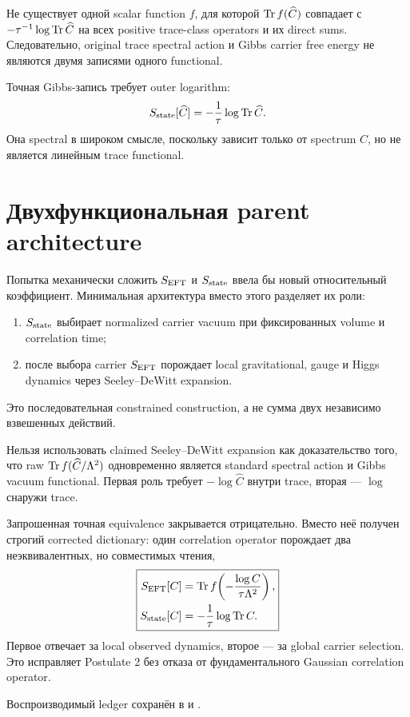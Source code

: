\begin{theorem}[Additivity no-go]
Не существует одной scalar function \(f\), для которой
\(\operatorname{Tr} f(\widehat C)\) совпадает с
\(-\tau^{-1}\log\operatorname{Tr}\widehat C\) на всех positive trace-class operators и их
direct sums. Следовательно, original trace spectral action и Gibbs carrier
free energy не являются двумя записями одного functional.
\end{theorem}

Точная Gibbs-запись требует outer logarithm:
\begin{equation}
 S_{\rm state}[\widehat C]
 =-\frac1\tau\log\operatorname{Tr}\widehat C.
 \label{eq:outer-log-state-action}
\end{equation}
Она spectral в широком смысле, поскольку зависит только от spectrum
\(\widehat C\), но не является линейным trace functional.

\section{Двухфункциональная parent architecture}

Попытка механически сложить \(S_{\rm EFT}\) и \(S_{\rm state}\) ввела бы
новый относительный коэффициент. Минимальная архитектура вместо этого
разделяет их роли:
\begin{enumerate}
 \item \(S_{\rm state}\) выбирает normalized carrier vacuum при фиксированных
 volume и correlation time;
 \item после выбора carrier \(S_{\rm EFT}\) порождает local gravitational,
 gauge и Higgs dynamics через Seeley--DeWitt expansion.
\end{enumerate}
Это последовательная constrained construction, а не сумма двух независимо
взвешенных действий.

\begin{nogocriterion}
Нельзя использовать claimed Seeley--DeWitt expansion как доказательство
того, что raw \(\operatorname{Tr} f(\widehat C/\Lambda^2)\) одновременно является
standard spectral action и Gibbs vacuum functional. Первая роль требует
\(-\log\widehat C\) внутри trace, вторая --- \(\log\) снаружи trace.
\end{nogocriterion}

\begin{theorem}
Запрошенная точная equivalence закрывается отрицательно. Вместо неё получен
строгий corrected dictionary: один correlation operator порождает два
неэквивалентных, но совместимых чтения,
\begin{equation}
 \boxed{
 \begin{aligned}
 S_{\rm EFT}[C]
 &=\operatorname{Tr} f\!\left(-\frac{\log C}{\tau\Lambda^2}\right),\\
 S_{\rm state}[C]
 &=-\frac1\tau\log\operatorname{Tr} C.
 \end{aligned}}
\end{equation}
Первое отвечает за local observed dynamics, второе --- за global carrier
selection. Это исправляет Postulate 2 без отказа от фундаментального
Gaussian correlation operator.
\end{theorem}

Воспроизводимый ledger сохранён в
 и
.